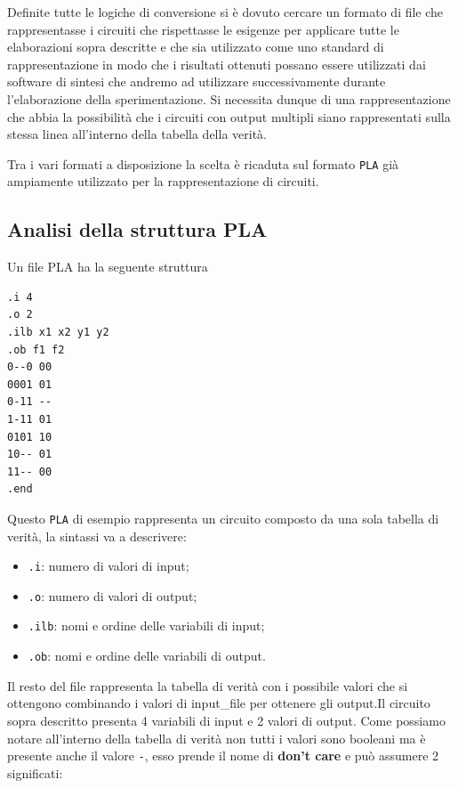\documentclass[
  italian,
]{book}
\providecommand{\tightlist}{%
  \setlength{\itemsep}{0pt}\setlength{\parskip}{0pt}}
\begin{document}
Definite tutte le logiche di conversione si è dovuto cercare un formato di file che rappresentasse i circuiti che rispettasse le esigenze per applicare tutte le elaborazioni sopra descritte e che sia utilizzato come uno standard di rappresentazione in modo che i risultati ottenuti possano essere utilizzati dai software di sintesi che andremo ad utilizzare successivamente durante l'elaborazione della sperimentazione. Si necessita dunque di una rappresentazione che abbia la possibilità che i circuiti con output multipli siano rappresentati sulla stessa linea all'interno della tabella della verità.

Tra i vari formati a disposizione la scelta è ricaduta sul formato \texttt{PLA} già ampiamente utilizzato per la rappresentazione di circuiti.

\newpage

\hypertarget{analisi-della-struttura-pla}{%
\subsection{Analisi della struttura PLA}\label{analisi-della-struttura-pla}}

Un file PLA ha la seguente struttura

\begin{verbatim}
.i 4
.o 2
.ilb x1 x2 y1 y2
.ob f1 f2
0--0 00    
0001 01
0-11 --
1-11 01
0101 10
10-- 01
11-- 00
.end
\end{verbatim}

Questo \texttt{PLA} di esempio rappresenta un circuito composto da una sola tabella di verità, la sintassi va a descrivere:

\begin{itemize}
\tightlist
\item
  \texttt{.i}: numero di valori di input;
\item
  \texttt{.o}: numero di valori di output;
\item
  \texttt{.ilb}: nomi e ordine delle variabili di input;
\item
  \texttt{.ob}: nomi e ordine delle variabili di output.
\end{itemize}

Il resto del file rappresenta la tabella di verità con i possibile valori che si ottengono combinando i valori di input\_file per ottenere gli output.Il circuito sopra descritto presenta 4 variabili di input e 2 valori di output. Come possiamo notare all'interno della tabella di verità non tutti i valori sono booleani ma è presente anche il valore \texttt{-}, esso prende il nome di \textbf{don't care} e può assumere 2 significati:
\end{document}
